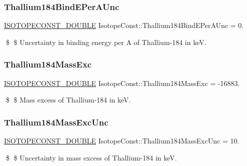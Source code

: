 \subsubsection{\texorpdfstring{Thallium184\+Bind\+E\+Per\+A\+Unc}{Thallium184BindEPerAUnc}}
{\footnotesize\ttfamily \mbox{\hyperlink{group___isotope_const-_macros_ga8f45a7272ce02c0b4c65c44636ed719a}{I\+S\+O\+T\+O\+P\+E\+C\+O\+N\+S\+T\+\_\+\+D\+O\+U\+B\+LE}} Isotope\+Const\+::\+Thallium184\+Bind\+E\+Per\+A\+Unc = 0.}

\$ \$ Uncertainty in binding energy per A of Thallium-\/184 in keV. \mbox{\label{group___isotope_const-_thallium-_tl184_ga93ffb6cf34e464bc13dd956a2915f13c}} 
\subsubsection{\texorpdfstring{Thallium184\+Mass\+Exc}{Thallium184MassExc}}
{\footnotesize\ttfamily \mbox{\hyperlink{group___isotope_const-_macros_ga8f45a7272ce02c0b4c65c44636ed719a}{I\+S\+O\+T\+O\+P\+E\+C\+O\+N\+S\+T\+\_\+\+D\+O\+U\+B\+LE}} Isotope\+Const\+::\+Thallium184\+Mass\+Exc = -\/16883.}

\$ \$ Mass excess of Thallium-\/184 in keV. \mbox{\label{group___isotope_const-_thallium-_tl184_gac3a0d51b2926d1bde4a38a052e24c952}} 
\subsubsection{\texorpdfstring{Thallium184\+Mass\+Exc\+Unc}{Thallium184MassExcUnc}}
{\footnotesize\ttfamily \mbox{\hyperlink{group___isotope_const-_macros_ga8f45a7272ce02c0b4c65c44636ed719a}{I\+S\+O\+T\+O\+P\+E\+C\+O\+N\+S\+T\+\_\+\+D\+O\+U\+B\+LE}} Isotope\+Const\+::\+Thallium184\+Mass\+Exc\+Unc = 10.}

\$ \$ Uncertainty in mass excess of Thallium-\/184 in keV. \mbox{\label{group___isotope_const-_thallium-_tl184_gad29ec3772f1b76800bab87df9b18c03f}} 
